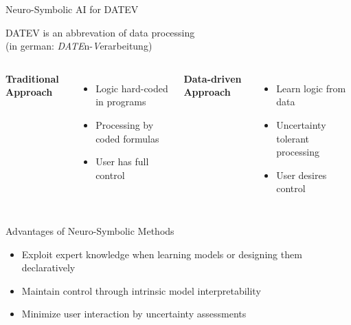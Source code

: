 \documentclass{beamer}
\begin{document}
\begin{frame}{Neuro-Symbolic AI for DATEV}

\begin{center}
	DATEV is an abbrevation of data processing \\ (in german: \emph{DATE}n-\emph{V}erarbeitung)
\end{center}
	\medskip

	
	\begin{columns}
		
		\textbf{Traditional Approach} 
		\begin{itemize}
			\item Logic hard-coded in programs
			\item Processing by coded formulas 
			\item User has full control
		\end{itemize}

		
		\textbf{Data-driven Approach} 
		\begin{itemize}
			\item Learn logic from data 
			\item Uncertainty tolerant processing
			\item User desires control
		\end{itemize}
		
	\end{columns}
	
	\medskip
	
	\begin{block}{Advantages of Neuro-Symbolic Methods}
		\begin{itemize}
			\item Exploit expert knowledge when learning models or designing them declaratively 
			\item Maintain control through intrinsic model interpretability
			\item Minimize user interaction by uncertainty assessments
		\end{itemize}
	\end{block}
	
\end{frame}
\end{document}
